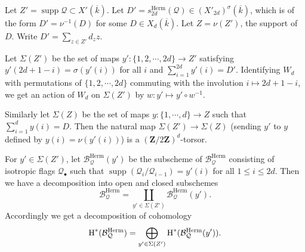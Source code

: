 \documentclass[reqno]{amsart}
\numberwithin{equation}{section}
\newcommand{\Z}{\mathbf{Z}}
\DeclareMathOperator{\Herm}{Herm}
\DeclareMathOperator{\supp}{supp}
\newcommand{\bu}{\bullet}
\newcommand{\ov}{\overline}
\renewcommand\c{\circ}
\newcommand{\cohog}[2]{\textup{H}^{#1}({#2})}     %
\newcommand{\s}{\sigma}
\newcommand\cB{\mathcal{B}}
\newcommand\cQ{\mathcal{Q}}
\theoremstyle{remark}
\numberwithin{equation}{section}
\begin{document}
Let $Z'=\supp\cQ\subset X'(\ov k)$.  Let $D'=s^{\Herm}_{2d}(\cQ)\in (X'_{2d})^{\s}(\ov k)$, which is of the form $D'=\nu^{-1}(D)$ for some $D\in X_{d}(\ov k)$. Let $Z=\nu(Z')$, the support of $D$. Write $D'=\sum_{z\in Z'}d_{z}z$. 

Let $\Sigma(Z')$ be the set of maps $y': \{1,2,\cdots,2d\}\to Z'$ satisfying $y'(2d+1-i)=\s(y'(i))$ for all $i$ and $\sum_{i=1}^{2d}y'(i)=D'$. Identifying $W_{d}$ with permutations of $\{1,2,\cdots,2d\}$ commuting with the involution $i\mapsto 2d+1-i$, we get an action of $W_{d}$ on $\Sigma(Z')$ by $w: y'\mapsto y'\c w^{-1}$.

Similarly let $\Sigma(Z)$ be the set of maps $y:\{1,\cdots, d\}\to Z$ such that $\sum_{i=1}^{d}y(i)=D$. Then the natural map $\Sigma(Z')\to \Sigma(Z)$ (sending $y'$ to $y$ defined by $y(i)=\nu(y'(i))$) is a $(\Z/2\Z)^{d}$-torsor. 

For $y'\in\Sigma(Z')$, let $\cB^{\Herm}_{\cQ}(y')$ be the subscheme of $\cB^{\Herm}_{\cQ}$ consisting of isotropic flags $\cQ_{\bu}$ such that $\supp(\cQ_{i}/\cQ_{i-1})=y'(i)$ for all $1\le i\le 2d$. Then we have a decomposition into open and closed subschemes
\begin{equation*}
\cB^{\Herm}_{\cQ}=\coprod_{y'\in \Sigma(Z')}\cB^{\Herm}_{\cQ}(y').
\end{equation*}
Accordingly we get a decomposition of cohomology
\begin{equation*}
\cohog{*}{\cB^{\Herm}_{\cQ}}=\bigoplus_{y'\in \Sigma(Z')}\cohog{*}{\cB^{\Herm}_{\cQ}(y')}.
\end{equation*}
\end{document}
